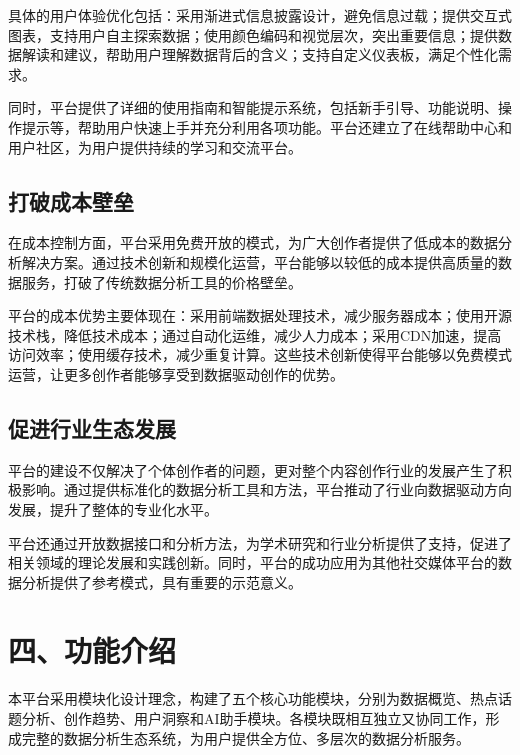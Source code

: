 \documentclass[12pt,a4paper]{article}
\begin{document}
具体的用户体验优化包括：采用渐进式信息披露设计，避免信息过载；提供交互式图表，支持用户自主探索数据；使用颜色编码和视觉层次，突出重要信息；提供数据解读和建议，帮助用户理解数据背后的含义；支持自定义仪表板，满足个性化需求。

同时，平台提供了详细的使用指南和智能提示系统，包括新手引导、功能说明、操作提示等，帮助用户快速上手并充分利用各项功能。平台还建立了在线帮助中心和用户社区，为用户提供持续的学习和交流平台。

\subsection{打破成本壁垒}

在成本控制方面，平台采用免费开放的模式，为广大创作者提供了低成本的数据分析解决方案。通过技术创新和规模化运营，平台能够以较低的成本提供高质量的数据服务，打破了传统数据分析工具的价格壁垒。

平台的成本优势主要体现在：采用前端数据处理技术，减少服务器成本；使用开源技术栈，降低技术成本；通过自动化运维，减少人力成本；采用CDN加速，提高访问效率；使用缓存技术，减少重复计算。这些技术创新使得平台能够以免费模式运营，让更多创作者能够享受到数据驱动创作的优势。

\subsection{促进行业生态发展}

平台的建设不仅解决了个体创作者的问题，更对整个内容创作行业的发展产生了积极影响。通过提供标准化的数据分析工具和方法，平台推动了行业向数据驱动方向发展，提升了整体的专业化水平。

平台还通过开放数据接口和分析方法，为学术研究和行业分析提供了支持，促进了相关领域的理论发展和实践创新。同时，平台的成功应用为其他社交媒体平台的数据分析提供了参考模式，具有重要的示范意义。

\section*{四、功能介绍}
\setcounter{section}{4}

本平台采用模块化设计理念，构建了五个核心功能模块，分别为数据概览、热点话题分析、创作趋势、用户洞察和AI助手模块。各模块既相互独立又协同工作，形成完整的数据分析生态系统，为用户提供全方位、多层次的数据分析服务。
\end{document}

